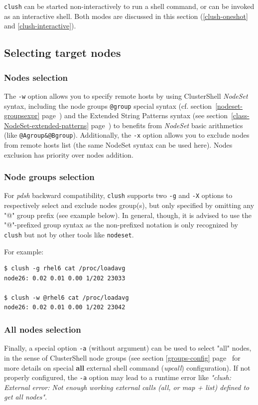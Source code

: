 \documentclass[english,a4paper]{csuserguide}
\newcommand{\NodeSet}{\textit{NodeSet}\xspace}
\newcommand{\nodeset}{\texttt{nodeset}\xspace}
\newcommand{\clush}{\texttt{clush}\xspace}
\begin{document}
\clush  can be started non-interactively to run a shell command, or can be invoked as an interactive shell. Both modes are discussed in this section (\ref{clush-oneshot} and \ref{clush-interactive}).

\subsection{Selecting target nodes}

\subsubsection{Nodes selection}

The \verb+-w+ option allows you to specify remote hosts by using ClusterShell \NodeSet syntax, including the node groups \lstinline{@group} special syntax (cf. section~\ref{nodeset-groupsexpr} page~\pageref{nodeset-groupsexpr}) and the Extended String Patterns syntax (see section~\ref{class-NodeSet-extended-patterns} page~\pageref{class-NodeSet-extended-patterns}) to benefits from \NodeSet basic arithmetics (like \lstinline{@Agroup&@Bgroup}). Additionally, the \verb+-x+ option allows you to exclude nodes from remote hosts list (the same NodeSet syntax can be used here). Nodes exclusion has priority over nodes addition.

\subsubsection{Node groups selection}
For \textit{pdsh} backward compatibility, \clush supports two \verb+-g+ and \verb+-X+ options to respectively select and exclude nodes group(s), but only specified by omitting any "@" group prefix (see example below). In general, though, it is advised to use the "@"-prefixed group syntax as the non-prefixed notation is only recognized by \clush but not by other tools like \nodeset.

\bigskip
\pagebreak[2]

For example:
\begin{lstlisting}[breaklines=true, breakatwhitespace=true]
$ clush -g rhel6 cat /proc/loadavg
node26: 0.02 0.01 0.00 1/202 23033

$ clush -w @rhel6 cat /proc/loadavg
node26: 0.02 0.01 0.00 1/202 23042
\end{lstlisting}

\subsubsection{All nodes selection}
\label{nodeset-all-nodes}
Finally, a special option \verb+-a+ (without argument) can be used to select "all" nodes, in the sense of ClusterShell node groups (see section \ref{groups-config} page~\pageref{groups-config} for more details on special \textbf{all} external shell command (\textit{upcall}) configuration). If not properly configured, the \verb+-a+ option may lead to a runtime error like \textit{"clush: External error: Not enough working external calls (all, or map + list) defined to get all nodes"}.
\end{document}
